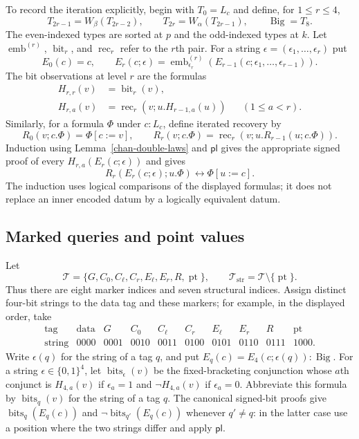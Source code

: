 To record the iteration explicitly, begin with $T_0=L_c$ and define, for
$1\le r\le4$,
\[
 T_{2r-1}=W_{\beta}(T_{2r-2}),\qquad
 T_{2r}=W_{\alpha}(T_{2r-1}),\qquad
 \operatorname{Big}=T_8.
\]
The even-indexed types are sorted at $p$ and the odd-indexed types at $k$.
Let $\operatorname{emb}^{(r)}$, $\operatorname{bit}_r$, and
$\operatorname{rec}_r$ refer to the $r$th pair.  For a string
$\epsilon=(\epsilon_1,\ldots,\epsilon_r)$ put
\[
 E_0(c)=c,\qquad
 E_r(c;\epsilon)=\operatorname{emb}^{(r)}_{\epsilon_r}
                (E_{r-1}(c;\epsilon_1,\ldots,\epsilon_{r-1})).
\]
The bit observations at level $r$ are the formulas
\[
\begin{aligned}
 H_{r,r}(v)&=\operatorname{bit}_r(v),\\
 H_{r,a}(v)&=\operatorname{rec}_r(v;u.H_{r-1,a}(u))
                      &&(1\le a<r).
\end{aligned}
\]
Similarly, for a formula $\Phi$ under $c:L_c$, define iterated recovery by
\[
 R_0(v;c.\Phi)=\Phi[c:=v],\qquad
 R_r(v;c.\Phi)=\operatorname{rec}_r(v;u.R_{r-1}(u;c.\Phi)).
\]
Induction using Lemma~\ref{chan-double-laws} and $\mathsf{pl}$ gives the
appropriate signed proof of every
$H_{r,a}(E_r(c;\epsilon))$ and gives
\begin{equation}
 R_r(E_r(c;\epsilon);u.\Phi)
       \leftrightarrow\Phi[u:=c].
\label{chan-iterated-recovery}
\end{equation}
The induction uses logical comparisons of the displayed formulas; it
does not replace an inner encoded datum by a logically equivalent datum.

\subsection{Marked queries and point values}

Let
\[
 \mathcal T=\{G,C_0,C_\ell,C_r,E_\ell,E_r,R,\operatorname{pt}\},
 \qquad
 \mathcal T_{\mathrm{str}}=\mathcal T\setminus\{\operatorname{pt}\}.
\]
Thus there are eight marker indices and seven structural indices.
Assign distinct four-bit strings to the data tag and these markers; for
example, in the displayed order, take
\[
\begin{array}{c|ccccccccc}
\text{tag}&\mathrm{data}&G&C_0&C_\ell&C_r&E_\ell&E_r&R&\operatorname{pt}\\ \hline
\text{string}&0000&0001&0010&0011&0100&0101&0110&0111&1000.
\end{array}
\]
Write $\epsilon(q)$ for the string of a tag $q$, and put
$E_q(c)=E_4(c;\epsilon(q)):\operatorname{Big}$.  For a string
$\epsilon\in\{0,1\}^4$, let $\operatorname{bits}_{\epsilon}(v)$ be the
fixed-bracketing conjunction whose $a$th conjunct is $H_{4,a}(v)$ if
$\epsilon_a=1$ and $\neg H_{4,a}(v)$ if $\epsilon_a=0$.
Abbreviate this formula by $\operatorname{bits}_{q}(v)$ for the string of
a tag $q$.  The canonical signed-bit proofs give
$\operatorname{bits}_{q}(E_q(c))$ and
$\neg\operatorname{bits}_{q'}(E_q(c))$ whenever $q'\ne q$: in the
latter case use a position where the two strings differ and apply
$\mathsf{pl}$.

